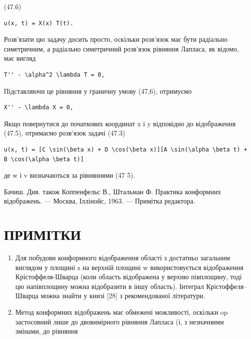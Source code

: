 \documentclass[
  ukrainian,
]{article}
\begin{document}
(47.6)

\begin{verbatim}
u(x, t) = X(x) T(t).
\end{verbatim}

Розв'язати цю задачу досить просто, оскільки розв'язок має бути
радіально симетричним, а радіально симетричний розв'язок рівняння
Лапласа, як відомо, має вигляд

\begin{verbatim}
T'' - \alpha^2 \lambda T = 0,
\end{verbatim}

Підставляючи це рівняння у граничну умову (47,6), отримуємо

\begin{verbatim}
X'' - \lambda X = 0,
\end{verbatim}

Якщо повернутися до початкових координат x і y відповідно до
відображення (47.5), отримаємо розв'язок задачі (47.3)

\begin{verbatim}
u(x, t) = [C \sin(\beta x) + D \cos(\beta x)][A \sin(\alpha \beta t) + B \cos(\alpha \beta t)]
\end{verbatim}

де w і v визначаються за рівняннями (47 5).

Бачиш. Див. також Коппенфельс В., Штальман Ф. Практика конформних
відображень. --- Москва, Іллінойс, 1963. --- Примітка редактора.

\section{ПРИМІТКИ}\label{ux43fux440ux438ux43cux456ux442ux43aux438-3}

\begin{enumerate}
\def\labelenumi{\arabic{enumi}.}
\item
  Для побудови конформного відображення області з достатньо загальним
  виглядом у площині z на верхній площині w використовується
  відображення Крістоффеля-Шварца (коли область відображена у верхню
  півплощину, тоді цю напівплощину можна відобразити в іншу область).
  Інтеграл Крістоффеля--Шварца можна знайти у книзі {[}28{]} з
  рекомендованої літератури.
\item
  Метод конформних відображень має обмежені можливості, оскільки op
  застосовний лише до двовимірного рівняння Лапласа (і, з незначними
  змінами, до рівняння
\end{enumerate}
\end{document}
